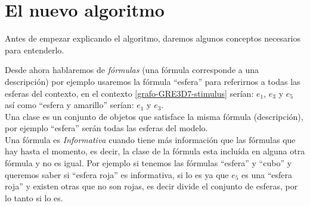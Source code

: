 



\section{El nuevo algoritmo}

Antes de empezar explicando el algoritmo, daremos algunos conceptos necesarios para entenderlo.

Desde ahora hablaremos de {\it f\'ormulas} (una f\'ormula corresponde a una descripci\'on) por ejemplo usaremos la f\'ormula ``esfera'' para referirnos a todas las esferas del contexto, en el contexto \ref{grafo-GRE3D7-stimulus} ser\'ian: $e_1$, $e_3$ y $e_5$  as\'i como ``esfera y amarillo'' ser\'ian: $e_1$ y $e_3$.\\

Una clase es un conjunto de objetos que satisface la misma f\'ormula (descripci\'on), por ejemplo ``esfera'' ser\'an todas las esferas del modelo.\\

Una f\'ormula es {\it Informativa} cuando tiene m\'as informaci\'on que las f\'ormulas que hay hasta el momento, es decir, la clase de la f\'ormula esta inclu\'ida en alguna otra f\'ormula y no es igual. Por ejemplo si tenemos las f\'ormulas ``esfera'' y ``cubo'' y queremos saber si ``esfera roja'' es informativa, si lo es ya que $e_5$ es una ``esfera roja'' y existen otras que no son rojas, es decir divide el conjunto de esferas, por lo tanto si lo es. \\

